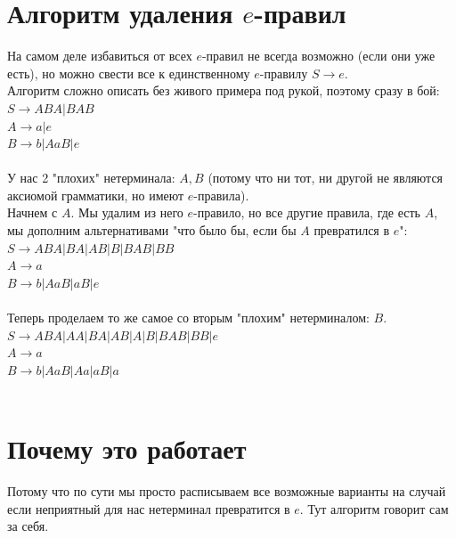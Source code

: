 \documentclass[14pt]{extreport}
\begin{document}
	\section{Алгоритм удаления $e$-правил}
	На самом деле избавиться от всех $e$-правил не всегда возможно (если они уже есть),
	но можно свести все к единственному $e$-правилу $S \to e$.\\
	Алгоритм сложно описать без живого примера под рукой, поэтому сразу в бой:\\
	$S \to ABA | BAB $\\
	$A \to a | e $\\
	$B \to b | AaB | e $\\\\
	У нас 2 "плохих" нетерминала: $A,B$ (потому что ни тот, ни другой не являются
	аксиомой грамматики, но имеют $e$-правила).\\
	Начнем с $A$. Мы удалим из него $e$-правило, но все другие правила, где есть $A$,
	мы дополним альтернативами "что было бы, если бы $A$ превратился в $e$":\\
	$S \to ABA | BA | AB | B | BAB | BB $\\
	$A \to a $\\
	$B \to b | AaB | aB | e $\\\\
	Теперь проделаем то же самое со вторым "плохим" нетерминалом: $B$.\\
	$S \to ABA | AA | BA | AB | A | B | BAB | BB | e $\\
	$A \to a $\\
	$B \to b | AaB | Aa | aB | a $\\\\
	\section{Почему это работает}
	Потому что по сути мы просто расписываем все возможные варианты на случай если
	неприятный для нас нетерминал превратится в $e$. Тут алгоритм говорит сам за себя.
\end{document}
